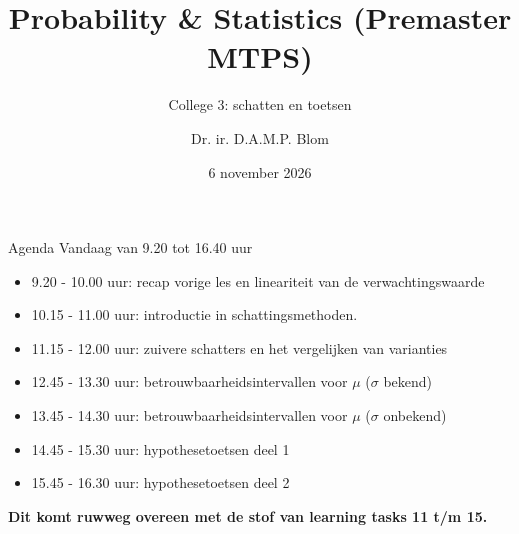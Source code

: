 \title[P\&S 2026/2027]{Probability \& Statistics (Premaster MTPS)}
\subtitle[College 3]{College 3: schatten en toetsen}  
\author{Dr. ir. D.A.M.P. Blom}
\date{6 november 2026}




    \begin{frame}
        \maketitle
    \end{frame}



    \begin{frame}{Agenda}
        Vandaag van 9.20 tot 16.40 uur
        \vfill
        {\small
        \begin{itemize}
            \item 9.20 - 10.00 uur: recap vorige les en lineariteit van de verwachtingswaarde
            \item 10.15 - 11.00 uur: introductie in schattingsmethoden.
            \item 11.15 - 12.00 uur: zuivere schatters en het vergelijken van varianties
            \item 12.45 - 13.30 uur: betrouwbaarheidsintervallen voor $\mu$ ($\sigma$ bekend)
            \item 13.45 - 14.30 uur: betrouwbaarheidsintervallen voor $\mu$ ($\sigma$ onbekend)
            \item 14.45 - 15.30 uur: hypothesetoetsen deel 1 
            \item 15.45 - 16.30 uur: hypothesetoetsen deel 2
        \end{itemize}
        }
        \vfill
        \textbf{Dit komt ruwweg overeen met de stof van learning tasks 11 t/m 15.}
    \end{frame}

